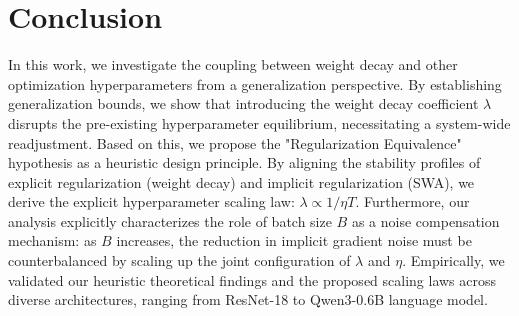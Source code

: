 \section{Conclusion}
In this work, we investigate the coupling between weight decay and other optimization hyperparameters from a generalization perspective. By establishing generalization bounds, we show that introducing the weight decay coefficient $\lambda$ disrupts the pre-existing hyperparameter equilibrium, necessitating a system-wide readjustment. Based on this, we propose the "Regularization Equivalence" hypothesis as a heuristic design principle. By aligning the stability profiles of explicit regularization (weight decay) and implicit regularization (SWA), we derive the explicit hyperparameter scaling law: $\lambda \propto 1/\eta T$. 
Furthermore, our analysis explicitly characterizes the role of batch size $B$ as a noise compensation mechanism: as $B$ increases, the reduction in implicit gradient noise must be counterbalanced by scaling up the joint configuration of $\lambda$ and $\eta$.
Empirically, we validated our heuristic theoretical findings and the proposed scaling laws across diverse architectures, ranging from ResNet-18 to Qwen3-0.6B language model. 



